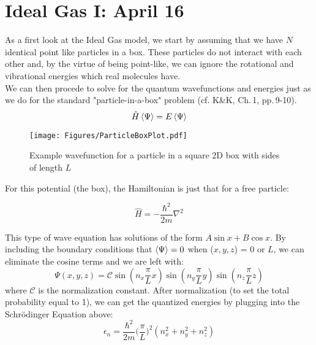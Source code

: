 \section{Ideal Gas I: April 16}
\label{s:IdealGasI}
As a first look at the Ideal Gas model, we start by assuming that we have $N$ identical point like particles in a box. These particles do not interact with each other and, by the virtue of being point-like, we can ignore the rotational and vibrational energies which real molecules have.\\

We can then procede to solve for the quantum wavefunctions and energies just as we do for the standard "particle-in-a-box" problem (cf. K\&K, Ch.\,1, pp.\,9-10).
\begin{equation}
\hat{H} \Braket{\Psi} = E \Braket{\Psi}
\end{equation}

\begin{figure}[h]
\centering
\texttt{[image: Figures/ParticleBoxPlot.pdf]}
\caption{Example wavefunction for a particle in a square 2D box 
	with sides of length $L$}
\end{figure}

For this potential (the box), the Hamiltonian is just that for a free 
particle:

\begin{equation}
\hat{H} = -\frac{\hbar^2}{2 m} \nabla^2
\end{equation}

This type of wave equation has solutions of the form $A \sin{x} + B \cos{x}$.
By including the boundary conditions that $\Braket{\Psi} = 0$ when
($x, y, z$) = $0$ or $L$, we can eliminate the cosine terms and we are left
with:
\begin{equation}
\Psi(x,y,z) = \mathcal{C} \sin(n_x \frac{\pi}{L} x) \sin(n_y \frac{\pi}{L} y) \sin(n_z \frac{\pi}{L} z)
\end{equation}
where $\mathcal{C}$ is the normalization constant. After normalization (to set the total probability equal to 1), we can get the quantized energies by plugging into the Schr\"odinger Equation above:
\begin{equation}
\epsilon_n = \frac{\hbar^2}{2 m}\bigg(\frac{\pi}{L} \bigg)^2 (n_x^2 + n_y^2 + n_z^2)
\label{eq:IdealGasEnergies}
\end{equation}

